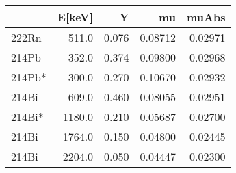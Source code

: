 \begin{tabular}{lrrrr}
\toprule
{} &  E[keV] &      Y &       mu &    muAbs \\
\midrule
222Rn  &   511.0 &  0.076 &  0.08712 &  0.02971 \\
214Pb  &   352.0 &  0.374 &  0.09800 &  0.02968 \\
214Pb* &   300.0 &  0.270 &  0.10670 &  0.02932 \\
214Bi  &   609.0 &  0.460 &  0.08055 &  0.02951 \\
214Bi* &  1180.0 &  0.210 &  0.05687 &  0.02700 \\
214Bi  &  1764.0 &  0.150 &  0.04800 &  0.02445 \\
214Bi  &  2204.0 &  0.050 &  0.04447 &  0.02300 \\
\bottomrule
\end{tabular}
